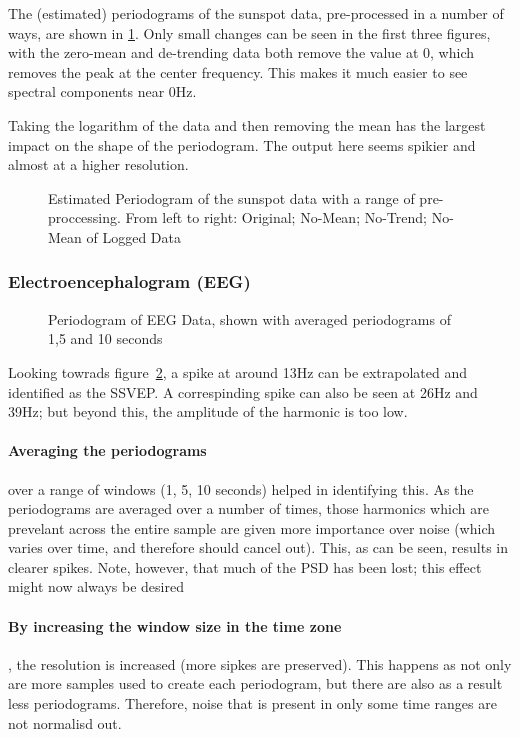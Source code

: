 \documentclass[main.tex]{subfiles}
\begin{document}
The (estimated) periodograms of the sunspot data, pre-processed in a number of ways, are shown in \ref{fig:q1_4_a}. Only small changes can be seen in the first three figures, with the zero-mean and de-trending data both remove the value at 0, which removes the peak at the center frequency. This makes it much easier to see spectral components near 0Hz.


Taking the logarithm of the data and then removing the mean has the largest impact on the shape of the periodogram. The output here seems spikier and almost at a higher resolution. 

\begin{figure}[H]
	\centering 
	\resizebox{\textwidth}{!}{}
	\caption{Estimated Periodogram of the sunspot data with a range of pre-proccessing. From left to right: Original; No-Mean; No-Trend; No-Mean of Logged Data}
	\label{fig:q1_4_a}
\end{figure}


\subsubsection{Electroencephalogram (EEG)}



\begin{figure}[H]
	\centering 
	\resizebox{\textwidth}{!}{}
	\caption{Periodogram of EEG Data, shown with averaged periodograms of 1,5 and 10 seconds}
	\label{fig:q1_4_b}
\end{figure}

Looking towrads figure~\ref{fig:q1_4_b}, a spike at around 13Hz can be extrapolated and identified as the SSVEP. A correspinding spike can also be seen at 26Hz and 39Hz; but beyond this, the amplitude of the harmonic is too low.

\paragraph{Averaging the periodograms} over a range of windows (1, 5, 10 seconds) helped in identifying this. As the periodograms are averaged over a number of times, those harmonics which are prevelant across the entire sample are given more importance over noise (which varies over time, and therefore should cancel out). This, as can be seen, results in clearer spikes. Note, however, that much of the PSD has been lost; this effect might now always be desired

\paragraph{By increasing the window size in the time zone}, the resolution is increased (more sipkes are preserved). This happens as not only are more samples used to create each periodogram, but there are also as a result less periodograms. Therefore, noise that is present in only some time ranges are not normalisd out.



\clearpage
\end{document}
